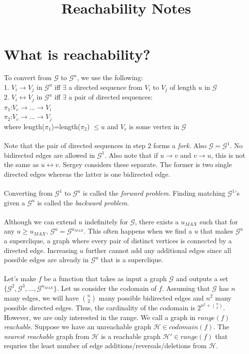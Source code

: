 \documentclass{article}
\theoremstyle{definition}
\begin{document}
\title{Reachability Notes}
\maketitle

\section{What is reachability?}

To convert from $\mathcal{G}$ to $\mathcal{G}^u$, we use the following:
\\
1. $V_i \rightarrow V_j$ in $\mathcal{G}^u$ iff $\exists$ a directed sequence from $V_i$ to $V_j$ of length $u$ in $\mathcal{G}$
\\
2. $V_i \leftrightarrow V_j$ in $\mathcal{G}^u$ iff $\exists$ a pair of directed sequences:
\\
$ \pi_1$:$ V_c \rightarrow ... \rightarrow V_i$
\\
$ \pi_2$:$ V_c \rightarrow ... \rightarrow V_j$
\\
where length($\pi_1$)=length($\pi_2$) $\leq u$ and $V_c$ is some vertex in $\mathcal{G}$ 
\\
\\
Note that the pair of directed sequences in step $2$ forms a \textit{fork}. Also $\mathcal{G}= \mathcal{G}^1$. No bidirected edges are allowed in $\mathcal{G}^1$. Also note that if $u \rightarrow v$ and $v \rightarrow u$, this is not the same as $u \leftrightarrow v$. Sergey considers these separate. The former is two single directed edges whereas the latter is one bidirected edge. 
\\
\\
Converting from $\mathcal{G}^1$ to $\mathcal{G}^u$ is called the \textit{forward problem}. Finding matching $\mathcal{G}^1$'s given a $\mathcal{G}^u$ is called the \textit{backward problem}. 
\\
\\
Although we can extend $u$ indefinitely for $\mathcal{G}$, there exists a $u_{MAX}$ such that for any $u \geq u_{MAX}$, $\mathcal{G}^u = \mathcal{G}^{u_{MAX}}$. This often happens when we find a $u$ that makes $\mathcal{G}^u$ a superclique, a graph where every pair of distinct vertices is connected by a directed edge. Increasing $u$ further cannot add any additional edges since all possible edges are already in $\mathcal{G}^u$ that is a superclique. 
\\
\\
Let's make $f$ be a function that takes as input a graph $\mathcal{G}$ and outputs a set $\{\mathcal{G}^2,\mathcal{G}^3,...,\mathcal{G}^{u_{MAX}}\}$. Let us consider the codomain of $f$. Assuming that $\mathcal{G}$ has $n$ many edges, we will have ${n \choose 2}$ many possible bidirected edges and $n^2$ many possible directed edges. Thus, the cardinality of the codomain is $2^{n^2+{n \choose 2}}$. However, we are only interested in the range. We call a graph in $range(f)$ \textit{reachable}. Suppose we have an unreachable graph $\mathcal{H} \in codomain(f)$. The \textit{nearest reachable} graph from $\mathcal{H}$ is a reachable graph $\mathcal{H'} \in range(f)$ that requries the least number of edge additions/reversals/deletions from $\mathcal{H}$.
\end{document}
